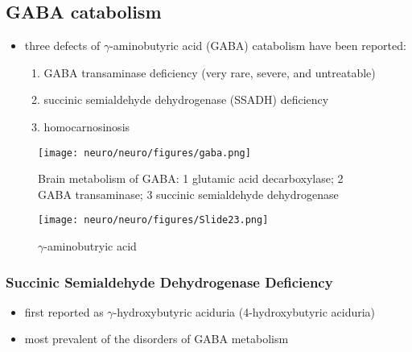 \documentclass{scrartcl}
\begin{document}
\subsection{GABA catabolism}
\label{sec:orgd15b79e}
\begin{itemize}
\item three defects of \(\gamma\)-aminobutyric acid (GABA) catabolism have been reported:
\begin{enumerate}
\item GABA transaminase deficiency (very rare, severe, and untreatable)
\item succinic semialdehyde dehydrogenase (SSADH) deficiency
\item homocarnosinosis
\end{enumerate}
\end{itemize}

\begin{figure}[htbp]
\centering
\texttt{[image: neuro/neuro/figures/gaba.png]}
\caption{\label{fig:org71a192a}Brain metabolism of GABA: 1 glutamic acid decarboxylase; 2 GABA transaminase; 3 succinic semialdehyde dehydrogenase}
\end{figure}

\begin{figure}[htbp]
\centering
\texttt{[image: neuro/neuro/figures/Slide23.png]}
\caption{\label{fig:org3a12254}\(\gamma\)-aminobutryic acid}
\end{figure}

\subsubsection{Succinic Semialdehyde Dehydrogenase Deficiency}
\label{sec:org8c59406}
\begin{itemize}
\item first reported as \(\gamma\)-hydroxybutyric aciduria (4-hydroxybutyric
aciduria)
\item most prevalent of the disorders of GABA metabolism
\end{itemize}
\end{document}
